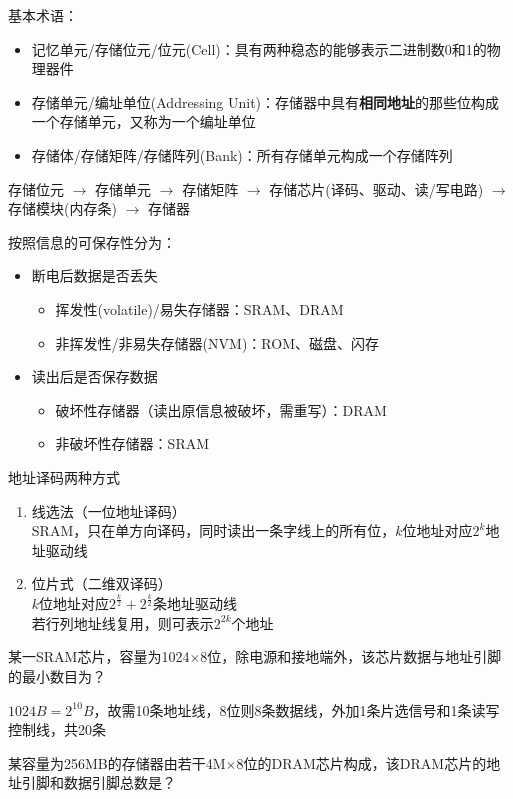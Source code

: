 基本术语：
\begin{itemize}
	\item 记忆单元/存储位元/位元(Cell)：具有两种稳态的能够表示二进制数0和1的物理器件
	\item 存储单元/编址单位(Addressing Unit)：存储器中具有\textbf{相同地址}的那些位构成一个存储单元，又称为一个编址单位
	\item 存储体/存储矩阵/存储阵列(Bank)：所有存储单元构成一个存储阵列
\end{itemize}
\begin{center}
存储位元 $\to$ 存储单元 $\to$ 存储矩阵 $\to$ 存储芯片(译码、驱动、读/写电路) $\to$ 存储模块(内存条) $\to$ 存储器
\end{center}
按照信息的可保存性分为：
\begin{itemize}
	\item 断电后数据是否丢失
	\begin{itemize}
		\item 挥发性(volatile)/易失存储器：SRAM、DRAM
		\item 非挥发性/非易失存储器(NVM)：ROM、磁盘、闪存
	\end{itemize}
	\item 读出后是否保存数据
	\begin{itemize}
		\item 破坏性存储器（读出原信息被破坏，需重写）：DRAM
		\item 非破坏性存储器：SRAM
	\end{itemize}
\end{itemize}
地址译码两种方式
\begin{enumerate}
	\item 线选法（一位地址译码）\\
	SRAM，只在单方向译码，同时读出一条字线上的所有位，$k$位地址对应$2^k$地址驱动线
	\item 位片式（二维双译码）\\
	$k$位地址对应$2^\frac{k}{2}+2^\frac{k}{2}$条地址驱动线\\
	若行列地址线复用，则可表示$2^{2k}$个地址
\end{enumerate}
\begin{example}
某一SRAM芯片，容量为1024$\times$8位，除电源和接地端外，该芯片数据与地址引脚的最小数目为？
\end{example}
\begin{analysis}
$1024B=2^{10}B$，故需10条地址线，8位则8条数据线，外加1条片选信号和1条读写控制线，共20条
\end{analysis}
\begin{example}[2014全国统考]
某容量为256MB的存储器由若干4M$\times$8位的DRAM芯片构成，该DRAM芯片的地址引脚和数据引脚总数是？
\end{example}
